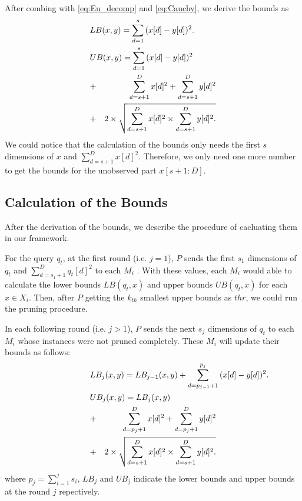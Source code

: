 After combing with \eqref{eq:Eu_decomp} and \eqref{eq:Cauchy}, we derive the bounds as 
{
\begin{eqnarray}
\lefteqn{LB(x,y) = \sum^s_{d=1}{(x[d]-y[d])^2}.} \label{eq:single-LB} \\
\lefteqn{UB(x,y) = \sum^s_{d=1}{(x[d]-y[d])^2}} \notag \\
& + & \sum^D_{d=s+1}{x[d]^2}+\sum^D_{d=s+1}{y[d]^2} \notag \\
& + & 2 \times \sqrt{\sum^D_{d=s+1}{x[d]^2}\times \sum^D_{d=s+1}{y[d]^2}.}\label{eq:single-UB}
\end{eqnarray}
}
We could notice that the calculation of the bounds only needs the first $s$ dimensions of $x$ and $\sum^D_{d=s+1}{x[d]^2}$.  Therefore, we only need one more number to get the bounds for the unobserved part $x[s+1:D]$.


\subsection{Calculation of the Bounds} %
\label{sub:calculation_the_bounds}
After the derivation of the bounds, we describe the procedure of cacluating them in our framework.  

For the query $q_t$, at the first round (i.e. $j=1$), $P$ sends the first $s_1$ dimensions of $q_t$ and $\sum^D_{d=s_1+1}{q_t[d]}^2$ to each $M_i$ .  With these values, each $M_i$ would able to calculate the lower bounds $LB(q_t,x)$ and upper bounds $UB(q_t,x)$ for each $x\in X_i$.  Then, after $P$ getting the $k_{th}$ smallest upper bounds as $thr$, we could run the pruning procedure.

In each following round (i.e. $j>1$), $P$ sends the next $s_j$ dimensions of $q_t$ to each $M_i$ whose instances were not pruned completely.  These $M_i$ will update their bounds as follows:
{
\begin{eqnarray}
\lefteqn{LB_j(x,y) = LB_{j-1}(x,y)+\sum^{p_j}_{d=p_{j-1}+1}{(x[d]-y[d])^2}.} \label{eq:single-LB} \\
\lefteqn{UB_j(x,y) = LB_{j}(x,y)} \notag \\
& + & \sum^D_{d=p_j+1}{x[d]^2}+\sum^D_{d=p_j+1}{y[d]^2} \notag \\
& + & 2 \times \sqrt{\sum^D_{d=s+1}{x[d]^2}\times \sum^D_{d=s+1}{y[d]^2}.}\label{eq:single-UB}
\end{eqnarray}
}
where $p_j=\sum^j_{i=1}{s_i}$, $LB_j$ and $UB_j$ indicate the lower bounds and upper bounds at the round $j$ repectively.


